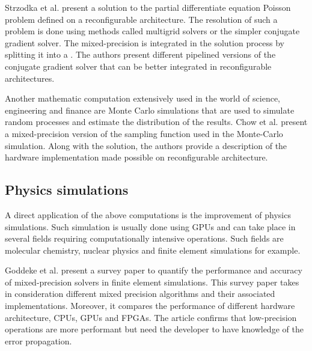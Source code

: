 Strzodka et al. \cite{Strzodka2006} present a solution to the partial differentiate equation Poisson problem defined on a reconfigurable architecture. The resolution of such a problem is done using methods called multigrid solvers or the simpler conjugate gradient solver. The mixed-precision is integrated in the solution process by splitting it into a . The authors present different pipelined versions of the conjugate gradient solver that can be better integrated in reconfigurable architectures.

Another mathematic computation extensively used in the world of science, engineering and finance are Monte Carlo simulations that are used to simulate random processes and estimate the distribution of the results. Chow et al. \cite{Chow2012} present a mixed-precision version of the sampling function used in the Monte-Carlo simulation. Along with the solution, the authors provide a description of the hardware implementation made possible on reconfigurable architecture.


\subsection{Physics simulations}

A direct application of the above computations is the improvement of physics simulations. Such simulation is usually done using GPUs  and can take place in several fields requiring computationally intensive operations. Such fields are molecular chemistry, nuclear physics and finite element simulations for example.


Goddeke et al. \cite{Goddeke2007} present a survey paper to quantify the performance and accuracy of mixed-precision solvers in finite element simulations. This survey paper takes in consideration different mixed precision algorithms and their associated implementations. Moreover, it compares the performance of different hardware architecture, CPUs, GPUs and FPGAs. The article confirms that low-precision operations are more performant but need the developer to have knowledge of the error propagation.


